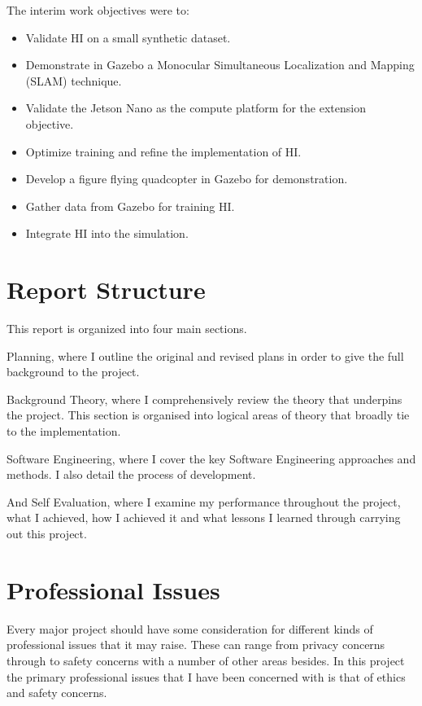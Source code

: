 \documentclass[]{../resources/final_report}
\begin{document}
The interim work objectives were to:
\begin{itemize}
  \item Validate HI on a small synthetic dataset.
  \item Demonstrate in Gazebo a Monocular Simultaneous Localization and Mapping (SLAM) technique.
  \item Validate the Jetson Nano as the compute platform for the extension objective.
  \item Optimize training and refine the implementation of HI.
  \item Develop a figure flying quadcopter in Gazebo for demonstration.
  \item Gather data from Gazebo for training HI.
  \item Integrate HI into the simulation.
\end{itemize}

\section{Report Structure}

This report is organized into four main sections.

Planning, where I outline the original and revised plans in order to give the full 
background to the project.

Background Theory, where I comprehensively review the theory that underpins the project.
This section is organised into logical areas of theory that broadly tie to the implementation.

Software Engineering, where I cover the key Software Engineering approaches and methods. I also 
detail the process of development.

And Self Evaluation, where I examine my performance throughout the project, what I achieved,
how I achieved it and what lessons I learned through carrying out this project.


\section{Professional Issues}

Every major project should have some consideration for different kinds of professional issues that
it may raise. These can range from privacy concerns through to safety concerns with a number of 
other areas besides. In this project the primary professional issues that I have been concerned with
is that of ethics and safety concerns.
\end{document}
